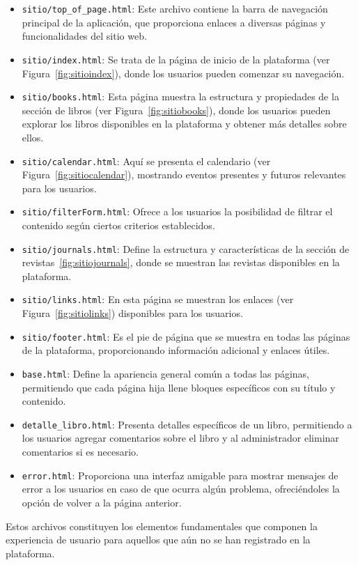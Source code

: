 \documentclass[a4paper, 12pt]{book}
\begin{document}
\begin{itemize}
  \item \texttt{sitio/top\_of\_page.html}: Este archivo contiene la barra de navegación principal de la aplicación, que proporciona enlaces a diversas páginas y funcionalidades del sitio web.
  \item \texttt{sitio/index.html}: Se trata de la página de inicio de la plataforma (ver Figura~\ref{fig:sitioindex}), donde los usuarios pueden comenzar su navegación.
  \item \texttt{sitio/books.html}: Esta página muestra la estructura y propiedades de la sección de libros (ver Figura~\ref{fig:sitiobooks}), donde los usuarios pueden explorar los libros disponibles en la plataforma y obtener más detalles sobre ellos.
  \item \texttt{sitio/calendar.html}: Aquí se presenta el calendario (ver Figura~\ref{fig:sitiocalendar}), mostrando eventos presentes y futuros relevantes para los usuarios.
  \item \texttt{sitio/filterForm.html}: Ofrece a los usuarios la posibilidad de filtrar el contenido según ciertos criterios establecidos.
  \item \texttt{sitio/journals.html}: Define la estructura y características de la sección de revistas~\ref{fig:sitiojournals}, donde se muestran las revistas disponibles en la plataforma.
  \item \texttt{sitio/links.html}: En esta página se muestran los enlaces (ver Figura~\ref{fig:sitiolinks}) disponibles para los usuarios.
  \item \texttt{sitio/footer.html}: Es el pie de página que se muestra en todas las páginas de la plataforma, proporcionando información adicional y enlaces útiles.
  \item \texttt{base.html}: Define la apariencia general común a todas las páginas, permitiendo que cada página hija llene bloques específicos con su título y contenido.
  \item \texttt{detalle\_libro.html}: Presenta detalles específicos de un libro, permitiendo a los usuarios agregar comentarios sobre el libro y al administrador eliminar comentarios si es necesario.
  \item \texttt{error.html}: Proporciona una interfaz amigable para mostrar mensajes de error a los usuarios en caso de que ocurra algún problema, ofreciéndoles la opción de volver a la página anterior.
\end{itemize}

Estos archivos constituyen los elementos fundamentales que componen la experiencia de usuario para aquellos que aún no se han registrado en la plataforma.
\end{document}
